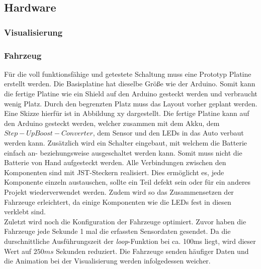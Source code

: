 \documentclass[.../Dokumentation.tex]{subfiles}
\begin{document}
    \subsection{Hardware}\label{sec-ita4-hardware}
    \subsubsection*{Visualisierung}
    
    \subsubsection*{Fahrzeug}
    Für die voll funktionsfähige und getestete Schaltung muss eine Prototyp Platine erstellt werden. Die Basisplatine hat dieselbe Größe wie der Arduino. Somit kann die fertige Platine wie ein Shield auf den Arduino gesteckt werden und verbraucht wenig Platz. Durch den begrenzten Platz muss das Layout vorher geplant werden. Eine Skizze hierfür ist in Abbildung xy dargestellt. %
    Die fertige Platine kann auf den Arduino gesteckt werden, welcher zusammen mit dem Akku, dem $Step-Up Boost-Converter$, dem Sensor und den LEDs in das Auto verbaut werden kann. Zusätzlich wird ein Schalter eingebaut, mit welchem die Batterie einfach an- beziehungsweise ausgeschaltet werden kann. Somit muss nicht die Batterie von Hand aufgesteckt werden.
    Alle Verbindungen zwischen den Komponenten sind mit JST-Steckern realisiert. Dies ermöglicht es, jede Komponente einzeln austauschen, sollte ein Teil defekt sein oder für ein anderes Projekt wiederverwendet werden. Zudem wird so das Zusammensetzen der Fahrzeuge erleichtert, da einige Komponenten wie die LEDs fest in diesen verklebt sind.\\
    Zuletzt wird noch die Konfiguration der Fahrzeuge optimiert. Zuvor haben die Fahrzeuge jede Sekunde 1 mal die erfassten Sensordaten gesendet. Da die durschnittliche Ausführungszeit der \emph{loop}-Funktion bei ca. 100ms liegt, wird dieser Wert auf $250ms$ Sekunden reduziert. Die Fahrzeuge senden häufiger Daten und die Animation bei der Visualisierung werden infolgedessen weicher.
    
\end{document}
